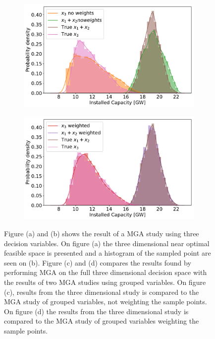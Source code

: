 \begin{figure}[h]
\begin{subfigure}{.5\textwidth}
		\caption{}
		\label{fig:multi_7}
	\end{subfigure}%
	\vspace{10pt}
	\begin{subfigure}{.5\textwidth}
		\centering
		\includegraphics[width=1.\textwidth]{./Images/multi_8}
		\caption{}
		\label{fig:multi_8}
	\end{subfigure}%
	\begin{subfigure}{.5\textwidth}
		\centering
		\includegraphics[width=1.\textwidth]{./Images/multi_9}
		\caption{}
		\label{fig:multi_9}
	\end{subfigure}
	\caption{Figure (a) and (b) shows the result of a MGA study using three decision variables. On figure (a) the three dimensional near optimal feasible space is presented and a histogram of the sampled point are seen on (b). Figure (c) and (d) compares the results found by performing MGA on the full three dimensional decision space with the results of two MGA studies using grouped variables. On figure (c), results from the three dimensional study is compared to the MGA study of grouped variables, not weighting the sample points. On figure (d) the results from the three dimensional study is compared to the MGA study of grouped variables weighting the sample points.}
	\label{fig:multi_comparison}
\end{figure}

